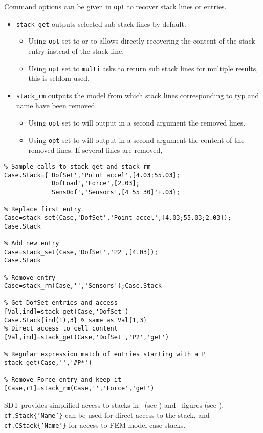 Command options can be given in {\tt opt} to recover stack lines or entries.
\begin{itemize}
\item {\tt stack\_get} outputs selected sub-stack lines by default. 
\begin{itemize}
\item Using {\tt opt} set to  or to  allows directly recovering the content of the stack entry instead of the stack line.
\item Using {\tt opt} set to {\tt multi} asks to return sub stack lines for multiple results, this is seldom used.
\end{itemize}

\item {\tt stack\_rm} outputs the model from which stack lines corresponding to typ and name have been removed.
\begin{itemize}
\item Using {\tt opt} set to  will output in a second argument the removed lines.
\item Using {\tt opt} set to  will output in a second argument the content of the removed lines. If several lines are removed, 
\end{itemize}
\end{itemize}

\rsyntax\begin{verbatim}
% Sample calls to stack_get and stack_rm
Case.Stack={'DofSet','Point accel',[4.03;55.03];
            'DofLoad','Force',[2.03];
            'SensDof','Sensors',[4 55 30]'+.03};

% Replace first entry
Case=stack_set(Case,'DofSet','Point accel',[4.03;55.03;2.03]);
Case.Stack

% Add new entry
Case=stack_set(Case,'DofSet','P2',[4.03]);
Case.Stack

% Remove entry
Case=stack_rm(Case,'','Sensors');Case.Stack

% Get DofSet entries and access
[Val,ind]=stack_get(Case,'DofSet')
Case.Stack{ind(1),3} % same as Val{1,3}
% Direct access to cell content
[Val,ind]=stack_get(Case,'DofSet','P2','get')

% Regular expression match of entries starting with a P
stack_get(Case,'','#P*')

% Remove Force entry and keep it
[Case,r1]=stack_rm(Case,'','Force','get')
\end{verbatim}\nlvs%


\begin{SDT}
SDT provides simplified access to stacks in \feplot\ (see ) and \iiplot\ figures (see ). {\tt cf.Stack\{'Name'\}} can be used for direct access to the stack, and {\tt cf.CStack\{'Name'\}} for access to FEM model case stacks.
\end{SDT}


